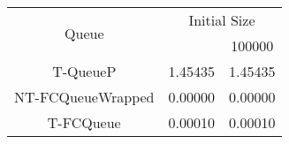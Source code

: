\begin{tabular}{|c|c|c|}
\hline
\multirow{2}{*}{Queue} & \multicolumn{2}{c|}{Initial Size}\\\cline{2-3}& \qquad 10000 \qquad\quad & 100000\\
\hline
\hline
T-QueueP & 1.45435 & 1.45435\\
NT-FCQueueWrapped & 0.00000 & 0.00000\\
T-FCQueue & 0.00010 & 0.00010\\
\hline\end{tabular}

